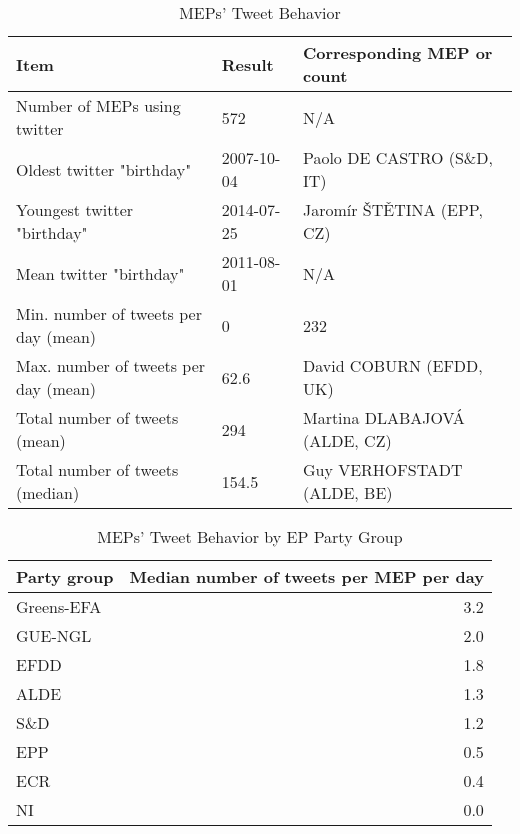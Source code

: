 \documentclass[12pt]{article}\usepackage[]{graphicx}\usepackage[]{color}
\begin{document}
\hspace*{-1cm}
\begin{table}[H]
\centering
\caption{MEPs' Tweet Behavior} 
\begin{tabular}{lll}
  \hline
Item & Result & Corresponding MEP or count \\ 
  \hline
Number of MEPs using twitter & 572 & N/A \\ 
  Oldest twitter "birthday" & 2007-10-04 & Paolo DE CASTRO (S\&D, IT) \\ 
  Youngest twitter "birthday" & 2014-07-25 & Jaromír ŠTĚTINA (EPP, CZ) \\ 
  Mean twitter "birthday" & 2011-08-01 & N/A \\ 
  Min. number of tweets per day (mean) & 0 & 232 \\ 
  Max. number of tweets per day (mean) & 62.6 & David COBURN (EFDD, UK) \\ 
  Total number of tweets (mean) & 294 & Martina DLABAJOVÁ (ALDE, CZ) \\ 
  Total number of tweets (median) & 154.5 & Guy VERHOFSTADT (ALDE, BE) \\ 
   \hline
\end{tabular}
\end{table}

\hspace*{-1cm}

\begin{table}[H]
\centering
\caption{MEPs' Tweet Behavior by EP Party Group} 
\begin{tabular}{lr}
  \hline
Party group & Median number of tweets per MEP per day \\ 
  \hline
Greens-EFA & 3.2 \\ 
  GUE-NGL & 2.0 \\ 
  EFDD & 1.8 \\ 
  ALDE & 1.3 \\ 
  S\&D & 1.2 \\ 
  EPP & 0.5 \\ 
  ECR & 0.4 \\ 
  NI & 0.0 \\ 
   \hline
\end{tabular}
\end{table}
\end{document}
